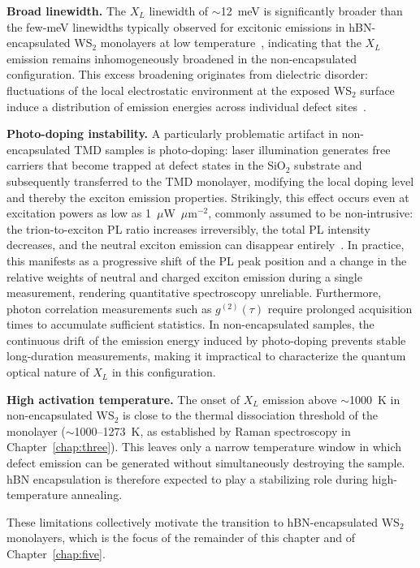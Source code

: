 \textbf{Broad linewidth.} The $X_L$ linewidth of $\sim$12~meV is significantly broader than the few-meV linewidths typically observed for excitonic emissions in hBN-encapsulated WS$_2$ monolayers at low temperature~\cite{cadiz-2017}, indicating that the $X_L$ emission remains inhomogeneously broadened in the non-encapsulated configuration. This excess broadening originates from dielectric disorder: fluctuations of the local electrostatic environment at the exposed WS$_2$ surface induce a distribution of emission energies across individual defect sites~\cite{raja-2019}.

\textbf{Photo-doping instability.} A particularly problematic artifact in non-encapsulated TMD samples is photo-doping: laser illumination generates free carriers that become trapped at defect states in the SiO$_2$ substrate and subsequently transferred to the TMD monolayer, modifying the local doping level and thereby the exciton emission properties. Strikingly, this effect occurs even at excitation powers as low as 1~$\mu$W~$\mu$m$^{-2}$, commonly assumed to be non-intrusive: the trion-to-exciton PL ratio increases irreversibly, the total PL intensity decreases, and the neutral exciton emission can disappear entirely~\cite{cadiz-2016}. In practice, this manifests as a progressive shift of the PL peak position and a change in the relative weights of neutral and charged exciton emission during a single measurement, rendering quantitative spectroscopy unreliable. Furthermore, photon correlation measurements such as $g^{(2)}(\tau)$ require prolonged acquisition times to accumulate sufficient statistics. In non-encapsulated samples, the continuous drift of the emission energy induced by photo-doping prevents stable long-duration measurements, making it impractical to characterize the quantum optical nature of $X_L$ in this configuration.

\textbf{High activation temperature.} The onset of $X_L$ emission above $\sim$1000~K in non-encapsulated WS$_2$ is close to the thermal dissociation threshold of the monolayer ($\sim$1000--1273~K, as established by Raman spectroscopy in Chapter~\ref{chap:three}). This leaves only a narrow temperature window in which defect emission can be generated without simultaneously destroying the sample. hBN encapsulation is therefore expected to play a stabilizing role during high-temperature annealing.

These limitations collectively motivate the transition to hBN-encapsulated WS$_2$ monolayers, which is the focus of the remainder of this chapter and of Chapter~\ref{chap:five}.



